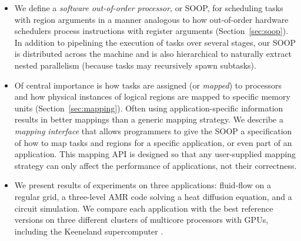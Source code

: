 \documentclass[conference]{IEEEtran}
\begin{document}

 
\begin{itemize}

\item We define a {\em software out-of-order processor}, or SOOP, for
  scheduling tasks with region arguments in a manner analogous to how
  out-of-order hardware schedulers process instructions with register
  arguments (Section~\ref{sec:soop}).  In addition to pipelining the execution of tasks over
  several stages, our SOOP is distributed across the machine and is
  also hierarchical to naturally extract nested
  parallelism (because tasks may recursively spawn subtasks).



\item Of central importance is how
tasks are assigned (or {\em mapped}) to processors and how physical instances of logical regions are
mapped to specific memory units (Section~\ref{sec:mapping}).  Often using
application-specific information results in better
mappings than a generic mapping strategy.  We describe
a {\em mapping interface} that allows programmers to give the SOOP a specification
of how to map tasks and regions for a specific application, or even part of an
application.  This mapping API is designed so that
any user-supplied mapping strategy can only affect the performance of applications,
not their correctness.  


\item We present results of experiments on three applications:
  fluid-flow on a regular grid, a three-level AMR code solving a
  heat diffusion equation, and a circuit simulation.
  We compare each application with the best reference
  versions on three different clusters of multicore processors with
  GPUs, including the Keeneland supercomputer \cite{Keeneland}.
%
%

\end{itemize}
\end{document}
